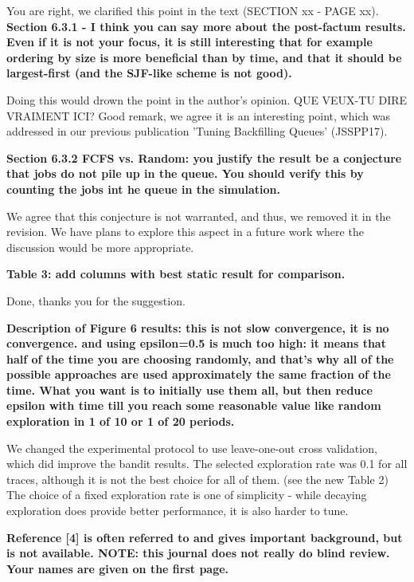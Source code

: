 \documentclass[]{article}
\begin{document}
You are right, we clarified this point in the text (SECTION xx - PAGE xx).\\

\textbf{Section 6.3.1 - I think you can say more about the post-factum results.  Even
if it is not your focus, it is still interesting that for example ordering
by size is more beneficial than by time, and that it should be
largest-first (and the SJF-like scheme is not good).}

Doing this would drown the point in the author's opinion. 
QUE VEUX-TU DIRE VRAIMENT ICI?
Good remark, we agree it is an interesting point, which was addressed in our previous publication 'Tuning
Backfilling Queues' (JSSPP17).
\medskip

  \textbf{Section 6.3.2 FCFS vs. Random: you justify the result be a conjecture that jobs do not pile up in the queue.  
  You should verify this by counting the jobs int he queue in the simulation.}

We agree that this conjecture is not warranted, and thus, we removed it in the revision.
We have plans to explore this aspect in a future work where the
discussion would be more appropriate.
\medskip

\textbf{Table 3: add columns with best static result for comparison.}

Done, thanks you for the suggestion.
\medskip

\textbf{Description of Figure 6 results: this is not slow convergence, it is no
convergence.  and using epsilon=0.5 is much too high: it means that half of the
time you are choosing randomly, and that's why all of the possible approaches
are used approximately the same fraction of the time. What you want is to
initially use them all, but then reduce epsilon with time till you reach some
reasonable value like random exploration in 1 of 10 or 1 of 20 periods.}

We changed the experimental protocol to use leave-one-out cross validation,
which did improve the bandit results. The selected exploration rate was 0.1 for
all traces, although it is not the best choice for all of them. (see the new
Table 2) The choice of a fixed exploration rate is one of simplicity - while
decaying exploration does provide better performance, it is also harder to
tune.
\medskip

\textbf{Reference [4] is often referred to and gives important background, but
is not available. NOTE: this journal does not really do blind review. Your
names are given on the first page.}
\end{document}
